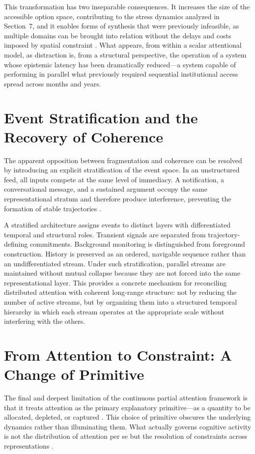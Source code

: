\documentclass[12pt, a4paper]{article}
\begin{document}
This transformation has two inseparable consequences. It increases the size of the accessible option space, contributing to the stress dynamics analyzed in Section~7, and it enables forms of synthesis that were previously infeasible, as multiple domains can be brought into relation without the delays and costs imposed by spatial constraint \cite{Hutchins1995}. What appears, from within a scalar attentional model, as distraction is, from a structural perspective, the operation of a system whose epistemic latency has been dramatically reduced---a system capable of performing in parallel what previously required sequential institutional access spread across months and years.

\section{Event Stratification and the Recovery of Coherence}

The apparent opposition between fragmentation and coherence can be resolved by introducing an explicit stratification of the event space. In an unstructured feed, all inputs compete at the same level of immediacy. A notification, a conversational message, and a sustained argument occupy the same representational stratum and therefore produce interference, preventing the formation of stable trajectories \cite{Wiener1948}.

A stratified architecture assigns events to distinct layers with differentiated temporal and structural roles. Transient signals are separated from trajectory-defining commitments. Background monitoring is distinguished from foreground construction. History is preserved as an ordered, navigable sequence rather than an undifferentiated stream. Under such stratification, parallel streams are maintained without mutual collapse because they are not forced into the same representational layer. This provides a concrete mechanism for reconciling distributed attention with coherent long-range structure: not by reducing the number of active streams, but by organizing them into a structured temporal hierarchy in which each stream operates at the appropriate scale without interfering with the others.

\section{From Attention to Constraint: A Change of Primitive}

The final and deepest limitation of the continuous partial attention framework is that it treats attention as the primary explanatory primitive---as a quantity to be allocated, depleted, or captured \cite{Simon1969}. This choice of primitive obscures the underlying dynamics rather than illuminating them. What actually governs cognitive activity is not the distribution of attention per se but the resolution of constraints across representations \cite{Friston2010,Clark2013}.
\end{document}
